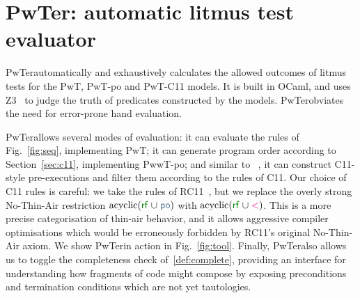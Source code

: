 \newcommand{\pwter}{{\sc PwTer}}

\section{\pwter: automatic litmus test evaluator}
\label{sec:tool}

\pwter automatically and exhaustively calculates the allowed outcomes of litmus tests for the PwT, PwT-po and PwT-C11 models. It is built in OCaml, and uses Z3~\cite{???} to judge the truth of predicates constructed by the models. \pwter obviates the need for error-prone hand evaluation.

\pwter allows several modes of evaluation: it can evaluate the rules of Fig.~\ref{fig:seq}, implementing PwT; it can generate program order according to Section~\ref{sec:c11}, implementing PwwT-po; and similar to \MRD~\cite{DBLP:conf/esop/PaviottiCPWOB20}, it can construct C11-style pre-executions and filter them according to the rules of C11.
Our choice of C11 rules is careful: we take the rules of RC11~\cite{DBLP:conf/pldi/LahavVKHD17}, but we replace the overly strong No-Thin-Air restriction $\text{acyclic}(\rrf\cup\rpox)$ with $\text{acyclic}(\rrf\cup\lt)$. 
This is a more precise categorisation of thin-air behavior, and it allows aggressive compiler optimisations which would be erroneously forbidden by RC11's original No-Thin-Air axiom.
We show \pwter in action in Fig.~\ref{fig:tool}.
Finally, \pwter also allows us to toggle the completeness check of~\ref{def:complete}, providing an interface for understanding how fragments of code might compose by exposing preconditions and termination conditions which are not yet tautologies.







